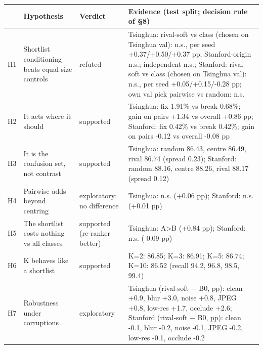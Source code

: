 \begin{tabular}{lp{4.2cm}p{2.6cm}p{8.4cm}}
\toprule
& Hypothesis & Verdict & Evidence (test split; decision rule of \S8) \\
\midrule
H1 & Shortlist conditioning beats equal-size controls & refuted & Tsinghua: rival-soft vs class (chosen on Tsinghua val): n.s., per seed +0.37/+0.50/+0.37 pp; Stanford-origin n.s.; independent n.s.; Stanford: rival-soft vs class (chosen on Tsinghua val): n.s., per seed +0.05/+0.15/-0.28 pp; own val pick pairwise vs random: n.s. \\
H2 & It acts where it should & supported & Tsinghua: fix 1.91\% vs break 0.68\%; gain on pairs +1.34 vs overall +0.86 pp; Stanford: fix 0.42\% vs break 0.42\%; gain on pairs -0.12 vs overall -0.08 pp \\
H3 & It is the confusion set, not contrast & supported & Tsinghua: random 86.43, centre 86.49, rival 86.74 (spread 0.23); Stanford: random 88.16, centre 88.26, rival 88.17 (spread 0.12) \\
H4 & Pairwise adds beyond centring & exploratory: no difference & Tsinghua: n.s. (+0.06 pp); Stanford: n.s. (+0.01 pp) \\
H5 & The shortlist costs nothing vs all classes & supported (re-ranker better) & Tsinghua: A>B (+0.84 pp); Stanford: n.s. (-0.09 pp) \\
H6 & K behaves like a shortlist & supported & K=2: 86.85; K=3: 86.91; K=5: 86.74; K=10: 86.52 (recall 94.2, 96.8, 98.5, 99.4) \\
H7 & Robustness under corruptions & exploratory & Tsinghua (rival-soft $-$ B0, pp): clean +0.9, blur +3.0, noise +0.8, JPEG +0.8, low-res +1.7, occlude +2.6; Stanford (rival-soft $-$ B0, pp): clean -0.1, blur -0.2, noise -0.1, JPEG -0.2, low-res -0.1, occlude -0.2 \\
\bottomrule
\end{tabular}
